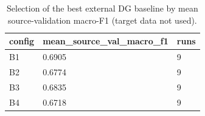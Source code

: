 \begin{table}[t]
\centering
\small
\caption{Selection of the best external DG baseline by mean source-validation macro-F1 (target data not used).}
\label{tab:T2b_best_baseline_selection}
\begin{tabular}{lll}
\hline
config & mean\_source\_val\_macro\_f1 & runs \\
\hline
B1 & 0.6905 & 9 \\
B2 & 0.6774 & 9 \\
B3 & 0.6835 & 9 \\
B4 & 0.6718 & 9 \\
\hline
\end{tabular}
\end{table}
